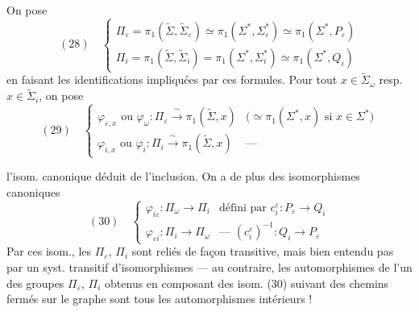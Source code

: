 \documentclass[11pt,a4paper]{article}
\begin{document}
On pose
\[
  (28)\quad
  \left\{
  \begin{array}{l}
    \Pi_\varepsilon = \pi_1(\widetilde{\Sigma}, \widetilde{\Sigma}_\varepsilon)
      \simeq \pi_1(\Sigma^{*}, \Sigma^{*}_\varepsilon)
      \simeq \pi_1(\Sigma^{*}, P_\varepsilon) \\[4pt]
    \Pi_i = \pi_1(\widetilde{\Sigma}, \widetilde{\Sigma}_i)
      = \pi_1(\Sigma^{*}, \Sigma^{*}_i)
      \simeq \pi_1(\Sigma^{*}, Q_i)
  \end{array}
  \right.
\]
en faisant les identifications impliquées par ces formules. \struck{\ill{}} Pour tout
$x \in \widetilde{\Sigma}_\omega$ resp. $x \in \widetilde{\Sigma}_i$, on pose
\[
  (29)\quad
  \left\{
  \begin{array}{ll}
    \varphi_{\varepsilon,x} \text{ ou } \varphi_\omega :
      \Pi_\varepsilon \xrightarrow{\ \sim\ } \pi_1(\widetilde{\Sigma}, x)
      & \big(\simeq \pi_1(\Sigma^{*}, x) \text{ si } x \in \Sigma^{*}\big) \\[4pt]
    \varphi_{i,x} \text{ ou } \varphi_i :
      \Pi_i \xrightarrow{\ \sim\ } \pi_1(\widetilde{\Sigma}, x)
      & \text{—}
  \end{array}
  \right.
\]

l'isom. canonique déduit de l'inclusion. On a de plus des isomorphismes canoniques
\[
  (30)\quad
  \left\{
  \begin{array}{ll}
    \varphi_{i\varepsilon} : \Pi_\omega \longrightarrow \Pi_i
      & \text{défini par } c_i^{\varepsilon} : P_\varepsilon \to Q_i \\[4pt]
    \varphi_{\varepsilon i} : \Pi_i \longrightarrow \Pi_\omega
      & \text{---\ } (c_i^{\varepsilon})^{-1} : Q_i \to P_\varepsilon
  \end{array}
  \right.
\]
Par ces isom., les $\Pi_\varepsilon$, $\Pi_i$ sont reliés de façon transitive, mais bien
entendu pas par un syst. transitif d'isomorphismes — au contraire, les automorphismes de
l'un des groupes $\Pi_\varepsilon$, $\Pi_i$ obtenus en composant des isom. (30) suivant des
chemins fermés sur le graphe
sont tous les automorphismes intérieurs !
\end{document}
